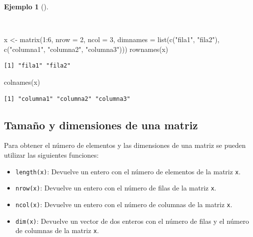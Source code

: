 \documentclass[
  spanish,
  a4paper,
]{scrreport}
\newenvironment{Shaded}{\begin{snugshade}}{\end{snugshade}}
\newcommand{\AttributeTok}[1]{\textcolor[rgb]{0.40,0.45,0.13}{#1}}
\newcommand{\DecValTok}[1]{\textcolor[rgb]{0.68,0.00,0.00}{#1}}
\newcommand{\FunctionTok}[1]{\textcolor[rgb]{0.28,0.35,0.67}{#1}}
\newcommand{\NormalTok}[1]{\textcolor[rgb]{0.00,0.23,0.31}{#1}}
\newcommand{\OtherTok}[1]{\textcolor[rgb]{0.00,0.23,0.31}{#1}}
\newcommand{\SpecialCharTok}[1]{\textcolor[rgb]{0.37,0.37,0.37}{#1}}
\newcommand{\StringTok}[1]{\textcolor[rgb]{0.13,0.47,0.30}{#1}}
\providecommand{\tightlist}{%
  \setlength{\itemsep}{0pt}\setlength{\parskip}{0pt}}
\theoremstyle{definition}
\theoremstyle{definition}
\newtheorem{example}{Ejemplo}[chapter]
\theoremstyle{remark}
\begin{document}
\begin{example}[]\protect\hypertarget{exm-obtencion-nombres-matriz}{}\label{exm-obtencion-nombres-matriz}

~

\begin{Shaded}
\begin{Highlighting}[]
\NormalTok{x }\OtherTok{\textless{}{-}} \FunctionTok{matrix}\NormalTok{(}\DecValTok{1}\SpecialCharTok{:}\DecValTok{6}\NormalTok{, }\AttributeTok{nrow =} \DecValTok{2}\NormalTok{, }\AttributeTok{ncol =} \DecValTok{3}\NormalTok{, }\AttributeTok{dimnames =} \FunctionTok{list}\NormalTok{(}\FunctionTok{c}\NormalTok{(}\StringTok{"fila1"}\NormalTok{, }\StringTok{"fila2"}\NormalTok{), }\FunctionTok{c}\NormalTok{(}\StringTok{"columna1"}\NormalTok{, }\StringTok{"columna2"}\NormalTok{, }\StringTok{"columna3"}\NormalTok{)))}
\FunctionTok{rownames}\NormalTok{(x)}
\end{Highlighting}
\end{Shaded}

\begin{verbatim}
[1] "fila1" "fila2"
\end{verbatim}

\begin{Shaded}
\begin{Highlighting}[]
\FunctionTok{colnames}\NormalTok{(x)}
\end{Highlighting}
\end{Shaded}

\begin{verbatim}
[1] "columna1" "columna2" "columna3"
\end{verbatim}

\end{example}

\subsection{Tamaño y dimensiones de una
matriz}\label{tamauxf1o-y-dimensiones-de-una-matriz}

Para obtener el número de elementos y las dimensiones de una matriz se
pueden utilizar las siguientes funciones:

\begin{itemize}
\tightlist
\item
  \texttt{length(x)}: Devuelve un entero con el número de elementos de
  la matriz \texttt{x}.
\item
  \texttt{nrow(x)}: Devuelve un entero con el número de filas de la
  matriz \texttt{x}.
\item
  \texttt{ncol(x)}: Devuelve un entero con el número de columnas de la
  matriz \texttt{x}.
\item
  \texttt{dim(x)}: Devuelve un vector de dos enteros con el número de
  filas y el número de columnas de la matriz \texttt{x}.
\end{itemize}
\end{document}
